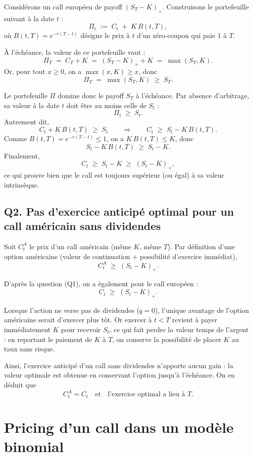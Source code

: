 Considérons un call européen de payoff $(S_T-K)_+$.  
Construisons le portefeuille suivant à la date $t$ :
\[
\Pi_t \;:=\; C_t \;+\; K\,B(t,T),
\]
où $B(t,T)=e^{-r(T-t)}$ désigne le prix à $t$ d'un zéro-coupon qui paie $1$ à $T$.

À l'échéance, la valeur de ce portefeuille vaut :
\[
\Pi_T \;=\; C_T + K \;=\; (S_T-K)_+ + K \;=\; \max(S_T,K).
\]
Or, pour tout $x\ge 0$, on a $\max(x,K)\ge x$, donc
\[
\Pi_T \;=\; \max(S_T,K) \;\ge\; S_T.
\]

Le portefeuille $\Pi$ domine donc le payoff $S_T$ à l'échéance.  
Par absence d'arbitrage, sa valeur à la date $t$ doit être au moins celle de $S_t$ :
\[
\Pi_t \;\ge\; S_t.
\]
Autrement dit,
\[
C_t + K\,B(t,T) \;\ge\; S_t
\qquad\Longrightarrow\qquad
C_t \;\ge\; S_t - K\,B(t,T).
\]
Comme $B(t,T)=e^{-r(T-t)}\le 1$, on a $K\,B(t,T)\le K$, donc
\[
S_t - K\,B(t,T) \;\ge\; S_t - K.
\]
Finalement,
\[
C_t \;\ge\; S_t - K \;\ge\; (S_t-K)_+,
\]
ce qui prouve bien que le call est toujours supérieur (ou égal) à sa valeur intrinsèque.

\subsection*{Q2. Pas d'exercice anticipé optimal pour un call américain sans dividendes}

Soit $C_t^{A}$ le prix d'un call américain (même $K$, même $T$).  
Par définition d'une option américaine (valeur de continuation + possibilité d'exercice immédiat),
\[
C_t^{A} \;\ge\; (S_t-K)_+.
\]

D'après la question (Q1), on a également pour le call européen :
\[
C_t \;\ge\; (S_t-K)_+.
\]

Lorsque l'action ne verse pas de dividendes ($q=0$), l'unique avantage de l'option américaine
serait d'exercer plus tôt. Or exercer à $t<T$ revient à payer immédiatement $K$ pour recevoir $S_t$,
ce qui fait perdre la valeur temps de l'argent : en reportant le paiement de $K$ à $T$,
on conserve la possibilité de placer $K$ au taux sans risque.

Ainsi, l'exercice anticipé d'un call sans dividendes n'apporte aucun gain : la valeur optimale
est obtenue en conservant l'option jusqu'à l'échéance. On en déduit que
\[
C_t^{A} = C_t
\quad\text{et}\quad
\text{l'exercice optimal a lieu à }T.
\]

\section{Pricing d'un call dans un modèle binomial}


